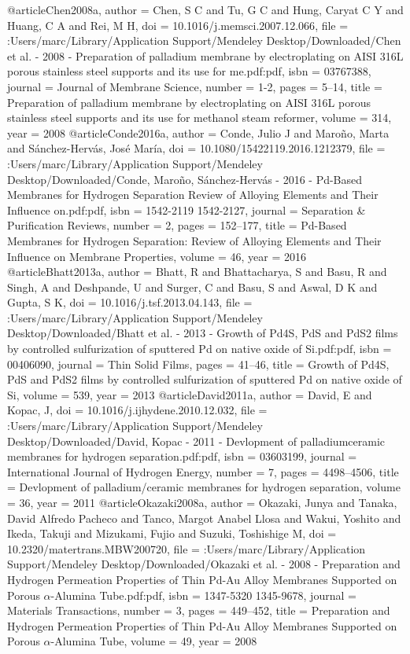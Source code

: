 @article{Chen2008a,
author = {Chen, S C and Tu, G C and Hung, Caryat C Y and Huang, C A and Rei, M H},
doi = {10.1016/j.memsci.2007.12.066},
file = {:Users/marc/Library/Application Support/Mendeley Desktop/Downloaded/Chen et al. - 2008 - Preparation of palladium membrane by electroplating on AISI 316L porous stainless steel supports and its use for me.pdf:pdf},
isbn = {03767388},
journal = {Journal of Membrane Science},
number = {1-2},
pages = {5--14},
title = {{Preparation of palladium membrane by electroplating on AISI 316L porous stainless steel supports and its use for methanol steam reformer}},
volume = {314},
year = {2008}
}
@article{Conde2016a,
author = {Conde, Julio J and Maro{\~{n}}o, Marta and S{\'{a}}nchez-Herv{\'{a}}s, Jos{\'{e}} Mar{\'{i}}a},
doi = {10.1080/15422119.2016.1212379},
file = {:Users/marc/Library/Application Support/Mendeley Desktop/Downloaded/Conde, Maro{\~{n}}o, S{\'{a}}nchez-Herv{\'{a}}s - 2016 - Pd-Based Membranes for Hydrogen Separation Review of Alloying Elements and Their Influence on.pdf:pdf},
isbn = {1542-2119
1542-2127},
journal = {Separation {\&} Purification Reviews},
number = {2},
pages = {152--177},
title = {{Pd-Based Membranes for Hydrogen Separation: Review of Alloying Elements and Their Influence on Membrane Properties}},
volume = {46},
year = {2016}
}
@article{Bhatt2013a,
author = {Bhatt, R and Bhattacharya, S and Basu, R and Singh, A and Deshpande, U and Surger, C and Basu, S and Aswal, D K and Gupta, S K},
doi = {10.1016/j.tsf.2013.04.143},
file = {:Users/marc/Library/Application Support/Mendeley Desktop/Downloaded/Bhatt et al. - 2013 - Growth of Pd4S, PdS and PdS2 films by controlled sulfurization of sputtered Pd on native oxide of Si.pdf:pdf},
isbn = {00406090},
journal = {Thin Solid Films},
pages = {41--46},
title = {{Growth of Pd4S, PdS and PdS2 films by controlled sulfurization of sputtered Pd on native oxide of Si}},
volume = {539},
year = {2013}
}
@article{David2011a,
author = {David, E and Kopac, J},
doi = {10.1016/j.ijhydene.2010.12.032},
file = {:Users/marc/Library/Application Support/Mendeley Desktop/Downloaded/David, Kopac - 2011 - Devlopment of palladiumceramic membranes for hydrogen separation.pdf:pdf},
isbn = {03603199},
journal = {International Journal of Hydrogen Energy},
number = {7},
pages = {4498--4506},
title = {{Devlopment of palladium/ceramic membranes for hydrogen separation}},
volume = {36},
year = {2011}
}
@article{Okazaki2008a,
author = {Okazaki, Junya and Tanaka, David Alfredo Pacheco and Tanco, Margot Anabel Llosa and Wakui, Yoshito and Ikeda, Takuji and Mizukami, Fujio and Suzuki, Toshishige M},
doi = {10.2320/matertrans.MBW200720},
file = {:Users/marc/Library/Application Support/Mendeley Desktop/Downloaded/Okazaki et al. - 2008 - Preparation and Hydrogen Permeation Properties of Thin Pd-Au Alloy Membranes Supported on Porous $\alpha$-Alumina Tube.pdf:pdf},
isbn = {1347-5320
1345-9678},
journal = {Materials Transactions},
number = {3},
pages = {449--452},
title = {{Preparation and Hydrogen Permeation Properties of Thin Pd-Au Alloy Membranes Supported on Porous $\alpha$-Alumina Tube}},
volume = {49},
year = {2008}
}
